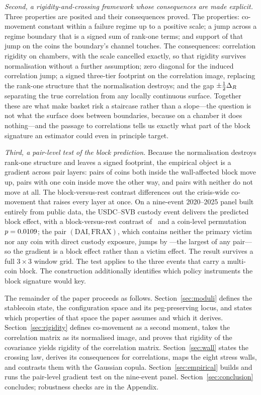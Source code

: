 \textit{Second, a rigidity-and-crossing framework whose consequences are made explicit.} Three properties are posited and their consequences proved. The properties: co-movement constant within a failure regime up to a positive scale; a jump across a regime boundary that is a signed sum of rank-one terms; and support of that jump on the coins the boundary's channel touches. The consequences: correlation rigidity on chambers, with the scale cancelled exactly, so that rigidity survives normalisation without a further assumption; zero diagonal for the induced correlation jump; a signed three-tier footprint on the correlation image, replacing the rank-one structure that the normalisation destroys; and the gap $\pm\tfrac12\Delta_R$ separating the true correlation from any locally continuous surface. Together these are what make basket risk a staircase rather than a slope---the question is not what the surface does between boundaries, because on a chamber it does nothing---and the passage to correlations tells us exactly what part of the block signature an estimator could even in principle target.

\textit{Third, a pair-level test of the block prediction.} Because the normalisation destroys rank-one structure and leaves a signed footprint, the empirical object is a gradient across pair layers: pairs of coins both inside the wall-affected block move up, pairs with one coin inside move the other way, and pairs with neither do not move at all. The block-versus-rest contrast differences out the crisis-wide co-movement that raises every layer at once. On a nine-event 2020--2025 panel built entirely from public data, the USDC--SVB custody event delivers the predicted block effect, with a block-versus-rest contrast of \GUSDCSVBDID\ and a coin-level permutation $p = 0.0109$; the pair $(\text{DAI},\text{FRAX})$, which contains neither the primary victim nor any coin with direct custody exposure, jumps by \GUSDCSVBPURE---the largest of any pair---so the gradient is a block effect rather than a victim effect. The result survives a full $3\times3$ window grid. The test applies to the three events that carry a multi-coin block. The construction additionally identifies which policy instruments the block signature would key.

The remainder of the paper proceeds as follows. Section~\ref{sec:moduli} defines the stablecoin state, the configuration space and its peg-preserving locus, and states which properties of that space the paper assumes and which it derives. Section~\ref{sec:rigidity} defines co-movement as a second moment, takes the correlation matrix as its normalised image, and proves that rigidity of the covariance yields rigidity of the correlation matrix. Section~\ref{sec:wall} states the crossing law, derives its consequences for correlations, maps the eight stress walls, and contrasts them with the Gaussian copula. Section~\ref{sec:empirical} builds and runs the pair-level gradient test on the nine-event panel. Section~\ref{sec:conclusion} concludes; robustness checks are in the Appendix.
